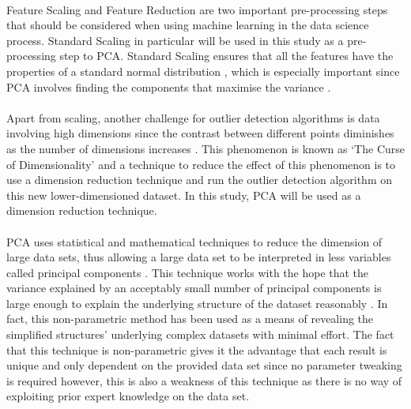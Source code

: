 \paragraph{ }Feature Scaling and Feature Reduction are two important pre-processing steps that should be considered when using machine learning in the data science process. Standard Scaling in particular will be used in this study as a pre-processing step to \ac{PCA}. Standard Scaling ensures that all the features have the properties of a standard normal distribution \cite{Scikitlearn}, which is especially important since \acs{PCA} involves finding the components that maximise the variance \cite{Shlens2014}. 

\paragraph{ }Apart from scaling, another challenge for outlier detection algorithms is data involving high dimensions since the contrast between different points diminishes as the number of dimensions increases \cite{Zimek2012}. This phenomenon is known as `The Curse of Dimensionality' and a technique to reduce the effect of this phenomenon is to use a dimension reduction technique and run the outlier detection algorithm on this new lower-dimensioned dataset. In this study, \acs{PCA} will be used as a dimension reduction technique.

\paragraph{ }\acs{PCA} uses statistical and mathematical techniques to reduce the dimension of large data sets, thus allowing a large data set to be interpreted in less variables called principal components \cite{Richardson2009}. This technique works with the hope that the variance explained by an acceptably small number of principal components is large enough to explain the underlying structure of the dataset reasonably \cite{Shlens2014}. In fact, this non-parametric method has been used as a means of revealing the simplified structures' underlying complex datasets with minimal effort. The fact that this technique is non-parametric gives it the advantage that each result is unique and only dependent on the provided data set since no parameter tweaking is required \cite{Shlens2014} however, this is also a weakness of this technique as there is no way of exploiting prior expert knowledge on the data set.

